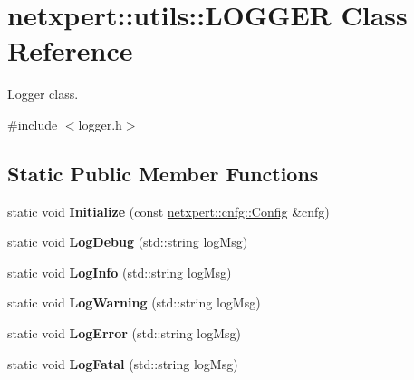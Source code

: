 \hypertarget{classnetxpert_1_1utils_1_1LOGGER}{}\section{netxpert\+:\+:utils\+:\+:L\+O\+G\+G\+ER Class Reference}
\label{classnetxpert_1_1utils_1_1LOGGER}


Logger class.  




{\ttfamily \#include $<$logger.\+h$>$}

\subsection*{Static Public Member Functions}
\begin{DoxyCompactItemize}
\item 
static void {\bfseries Initialize} (const \hyperlink{structnetxpert_1_1cnfg_1_1Config}{netxpert\+::cnfg\+::\+Config} \&cnfg)\hypertarget{classnetxpert_1_1utils_1_1LOGGER_ad122b92cee3035750ea187afc31d13d8}{}\label{classnetxpert_1_1utils_1_1LOGGER_ad122b92cee3035750ea187afc31d13d8}

\item 
static void {\bfseries Log\+Debug} (std\+::string log\+Msg)\hypertarget{classnetxpert_1_1utils_1_1LOGGER_aa9150ff82d540dbdd39f90e8f4690ba6}{}\label{classnetxpert_1_1utils_1_1LOGGER_aa9150ff82d540dbdd39f90e8f4690ba6}

\item 
static void {\bfseries Log\+Info} (std\+::string log\+Msg)\hypertarget{classnetxpert_1_1utils_1_1LOGGER_a1e480b4dc6a33bca4e6a732e018841a9}{}\label{classnetxpert_1_1utils_1_1LOGGER_a1e480b4dc6a33bca4e6a732e018841a9}

\item 
static void {\bfseries Log\+Warning} (std\+::string log\+Msg)\hypertarget{classnetxpert_1_1utils_1_1LOGGER_a184af8779965d8663ca84b4f7e4ba3e9}{}\label{classnetxpert_1_1utils_1_1LOGGER_a184af8779965d8663ca84b4f7e4ba3e9}

\item 
static void {\bfseries Log\+Error} (std\+::string log\+Msg)\hypertarget{classnetxpert_1_1utils_1_1LOGGER_af336fd2d432bf26747590f3a3a5a92c3}{}\label{classnetxpert_1_1utils_1_1LOGGER_af336fd2d432bf26747590f3a3a5a92c3}

\item 
static void {\bfseries Log\+Fatal} (std\+::string log\+Msg)\hypertarget{classnetxpert_1_1utils_1_1LOGGER_aea1f7109666d88ce88e7612494ee59f1}{}\label{classnetxpert_1_1utils_1_1LOGGER_aea1f7109666d88ce88e7612494ee59f1}

\end{DoxyCompactItemize}
